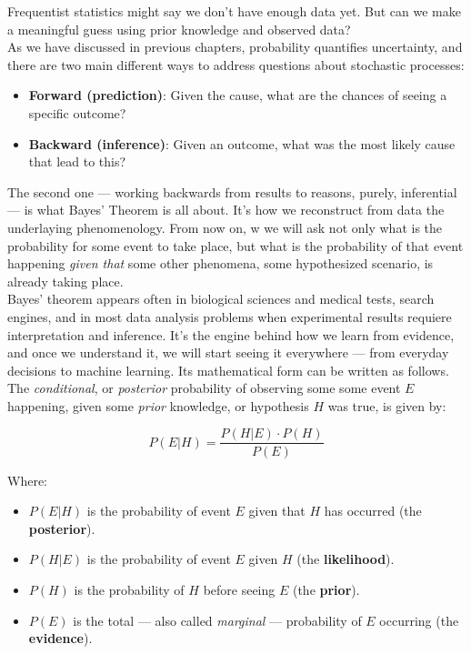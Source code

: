 \documentclass{book}
\begin{document}
Frequentist statistics might say we don't have enough data yet. But can we make a meaningful guess using prior knowledge and observed data?\\


As we have discussed in previous chapters, probability quantifies uncertainty, and there are two main different ways to address questions about stochastic processes:
\begin{itemize}
  \item \textbf{Forward (prediction)}: Given the cause, what are the chances of seeing a specific outcome?
  \item \textbf{Backward (inference)}: Given an outcome, what was the most likely cause that lead to this?
\end{itemize}

The second one — working backwards from results to reasons, purely, inferential — is what Bayes’ Theorem is all about. It’s how we reconstruct from data the underlaying phenomenology. From now on, w we will ask not only what is the probability for some event to take place, but what is the probability of that event happening \textit{given that} some other phenomena, some hypothesized scenario, is already taking place.\\

Bayes’ theorem appears often in biological sciences and medical tests, search engines, and in most data analysis problems when experimental results requiere interpretation and inference. It’s the engine behind how we learn from evidence, and once we understand it, we will start seeing it everywhere — from everyday decisions to machine learning. Its mathematical form can be written as follows. The \textit{conditional}, or \textit{posterior} probability of observing some some event $E$ happening, given some \textit{prior} knowledge, or hypothesis $H$ was true, is given by:

\begin{equation}
P(E|H) = \frac{P(H|E) \cdot P(H)}{P(E)}
\end{equation}

Where:
\begin{itemize}
  \item $P(E|H)$ is the probability of event $E$ given that $H$ has occurred (the \textbf{posterior}).
  \item $P(H|E)$ is the probability of event $E$ given $H$ (the \textbf{likelihood}).
  \item $P(H)$ is the probability of $H$ before seeing $E$ (the \textbf{prior}).
  \item $P(E)$ is the total — also called \textit{marginal} — probability of $E$ occurring (the \textbf{evidence}).
\end{itemize}
\end{document}

